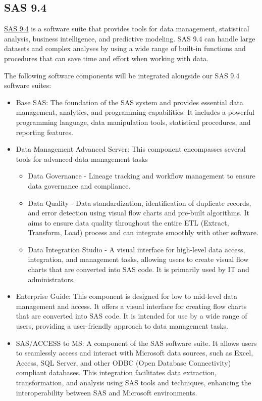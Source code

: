 \subsection{SAS 9.4}
\href{https://documentation.sas.com/doc/en/pgmsascdc/9.4_3.5/whatsnew/n17cszme3e52b4n1ooe3710fnuec.htm#:~:text=For%20SAS%20administrators%2C%20SAS%209.4,more%20complete%20data%20management%20solution.}{SAS 9.4} is a software suite that provides tools for data management, statistical analysis, business intelligence, and predictive modeling. SAS 9.4 can handle large datasets and complex analyses by using a wide range of built-in functions and procedures that can save time and effort when working with data. 

The following software components will be integrated alongside our SAS 9.4 software suites:

\begin{itemize}
        \item Base SAS: The foundation of the SAS system and provides essential data management, analytics, and programming capabilities. It includes a powerful programming language, data manipulation tools, statistical procedures, and reporting features.
        \item Data Management Advanced Server: This component encompasses several tools for advanced data management tasks
        \begin{itemize}
            \item Data Governance - Lineage tracking and workflow management to ensure data governance and compliance.
            \item Data Quality - Data standardization, identification of duplicate records, and error detection using visual flow charts and pre-built algorithms. It aims to ensure data quality throughout the entire ETL (Extract, Transform, Load) process and can integrate smoothly with other software.
            \item Data Integration Studio - A visual interface for high-level data access, integration, and management tasks, allowing users to create visual flow charts that are converted into SAS code. It is primarily used by IT and administrators.
        \end{itemize}
        \item Enterprise Guide:  This component is designed for low to mid-level data management and access. It offers a visual interface for creating flow charts that are converted into SAS code. It is intended for use by a wide range of users, providing a user-friendly approach to data management tasks.
        \item SAS/ACCESS to MS: A component of the SAS software suite. It allows users to seamlessly access and interact with Microsoft data sources, such as Excel, Access, SQL Server, and other ODBC (Open Database Connectivity) compliant databases. This integration facilitates data extraction, transformation, and analysis using SAS tools and techniques, enhancing the interoperability between SAS and Microsoft environments.
    \end{itemize}


